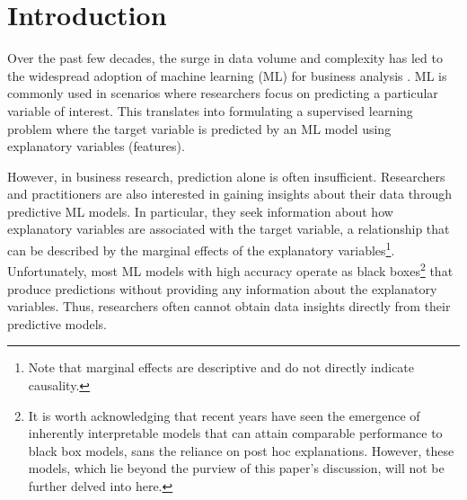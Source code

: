 \documentclass[12pt]{article}  %
\begin{document}
\maketitle

\section{Introduction}

Over the past few decades, the surge in data volume and complexity has led to the widespread adoption of machine learning (ML) for business analysis \citep{kleinberg2015prediction,mullainathan17applied}. ML is commonly used in scenarios where researchers focus on predicting a particular variable of interest. This translates into formulating a supervised learning problem where the target variable is predicted by an ML model using explanatory variables (features).

However, in business research, prediction alone is often insufficient. Researchers and practitioners are also interested in gaining insights about their data through predictive ML models. In particular, they seek information about how explanatory variables are associated with the target variable, a relationship that can be described by the marginal effects of the explanatory variables\footnote{Note that marginal effects are descriptive and do not directly indicate causality.}. 
Unfortunately, most ML models with high accuracy operate as black boxes\footnote{It is worth acknowledging that recent years have seen the emergence of inherently interpretable models that can attain comparable performance to black box models, sans the reliance on post hoc explanations. However, these models, which lie beyond the purview of this paper's discussion, will not be further delved into here.} that produce predictions without providing any information about the explanatory variables. Thus, researchers often cannot obtain data insights directly from their predictive models.
\end{document}
